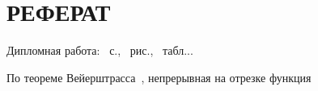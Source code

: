 \begin{sloppypar} %
\newpage %
\section*{РЕФЕРАТ} %




Дипломная работа: \pageref*{LastPage}~с., \totfig~рис., \tottab~табл...



По теореме Вейерштрасса~\cite {F},
непрерывная на отрезке функция %


\end{sloppypar}

